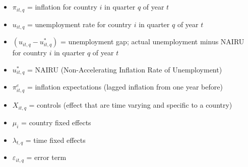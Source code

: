 \documentclass[preprint,10pt,authoryear]{elsarticle}
\begin{document}
\appendix


\section{}

\begin{itemize}
    \item $\pi_{it,q}$ = inflation for country $i$ in quarter $q$ of year $t$
    \item $u_{it,q}$ = unemployment rate for country $i$ in quarter $q$ of year $t$
    \item $(u_{it,q} - u^{*}_{it,q})$ = unemployment gap; actual unemployment minus NAIRU for country $i$ in quarter $q$ of year $t$
    \item $u^{*}_{it,q}$ = NAIRU (Non-Accelerating Inflation Rate of Unemployment)
    \item $\pi^{e}_{it,q}$ = inflation expectations (lagged inflation from one year before)
    \item $X_{it,q}$ = controls (effect that are time varying and specific to a country)
    \item $\mu_{i}$ = country fixed effects
    \item $\lambda_{t,q}$ = time fixed effects
    \item $\varepsilon_{it,q}$ = error term
\end{itemize}
\end{document}
